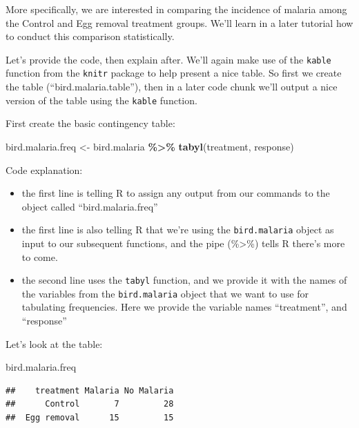 \documentclass[
]{book}
\newenvironment{Shaded}{\begin{snugshade}}{\end{snugshade}}
\newcommand{\FunctionTok}[1]{\textcolor[rgb]{0.13,0.29,0.53}{\textbf{#1}}}
\newcommand{\NormalTok}[1]{#1}
\newcommand{\OtherTok}[1]{\textcolor[rgb]{0.56,0.35,0.01}{#1}}
\newcommand{\SpecialCharTok}[1]{\textcolor[rgb]{0.81,0.36,0.00}{\textbf{#1}}}
\providecommand{\tightlist}{%
  \setlength{\itemsep}{0pt}\setlength{\parskip}{0pt}}
\begin{document}
More specifically, we are interested in comparing the incidence of malaria among the Control and Egg removal treatment groups. We'll learn in a later tutorial how to conduct this comparison statistically.

Let's provide the code, then explain after. We'll again make use of the \texttt{kable} function from the \texttt{knitr} package to help present a nice table. So first we create the table (``bird.malaria.table''), then in a later code chunk we'll output a nice version of the table using the \texttt{kable} function.

First create the basic contingency table:

\begin{Shaded}
\begin{Highlighting}[]
\NormalTok{bird.malaria.freq }\OtherTok{\textless{}{-}}\NormalTok{ bird.malaria }\SpecialCharTok{\%\textgreater{}\%}
  \FunctionTok{tabyl}\NormalTok{(treatment, response)}
\end{Highlighting}
\end{Shaded}

Code explanation:

\begin{itemize}
\tightlist
\item
  the first line is telling R to assign any output from our commands to the object called ``bird.malaria.freq''
\item
  the first line is also telling R that we're using the \texttt{bird.malaria} object as input to our subsequent functions, and the pipe (\%\textgreater\%) tells R there's more to come.
\item
  the second line uses the \texttt{tabyl} function, and we provide it with the names of the variables from the \texttt{bird.malaria} object that we want to use for tabulating frequencies. Here we provide the variable names ``treatment'', and ``response''
\end{itemize}

Let's look at the table:

\begin{Shaded}
\begin{Highlighting}[]
\NormalTok{bird.malaria.freq}
\end{Highlighting}
\end{Shaded}

\begin{verbatim}
##    treatment Malaria No Malaria
##      Control       7         28
##  Egg removal      15         15
\end{verbatim}
\end{document}

